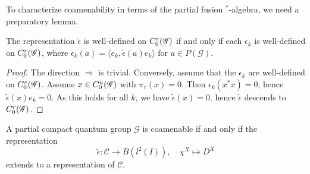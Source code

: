 
To characterize coamenability in terms of the partial fusion $^*$-algebra, we need a preparatory lemma.

\begin{Lem} The representation $\tilde{\epsilon}$ is well-defined on $C^{r}_{0}(\mathscr{G})$ if and only if each $\epsilon_k$ is well-defined on $C^{r}_{0}(\mathscr{G})$, where $\epsilon_k(a) = \langle e_k,\tilde{\epsilon}(a)e_k\rangle$ for $a\in P(\mathscr{G})$.
\end{Lem}

\begin{proof} The direction $\Rightarrow$ is trivial. Conversely, assume that the $\epsilon_k$ are well-defined on $C^{r}_{0}(\mathscr{G})$. Assume $x\in C^{u}_{0}(\mathscr{G})$ with $\pi_r(x) = 0$. Then $\epsilon_k(x^*x)=0$, hence $\tilde{\epsilon}(x)e_k=0$. As this holds for all $k$, we have $\tilde{\epsilon}(x)=0$, hence $\tilde{\epsilon}$ descends to $C^{r}_{0}(\mathscr{G})$.
\end{proof} 

\begin{Theorem} A partial compact quantum group $\mathscr{G}$ is coamenable if and only if the representation \[\tilde{\epsilon}: \mathscr{C} \rightarrow B(l^2(I)), \quad \chi^X \mapsto D^X\] extends to a representation of $\mathcal{C}$.
\end{Theorem}

